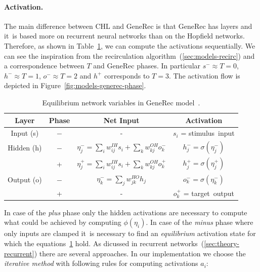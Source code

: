 \paragraph{Activation.} 
\label{sec:models-generec-activation} 
The main difference between CHL and GeneRec is that GeneRec has layers and it~is based more on recurrent neural networks than on the Hopfield networks. Therefore, as shown in Table~\ref{tab:models-generec}, we can compute the activations sequentially. We can see the inspiration from the recirculation algorithm~(\ref{sec:models-recirc}) and a correspondence between $T$ and GeneRec phases. In particular $s^{-} \approx T=0$, $h^{-} \approx T=1$, $o^{-} \approx T=2$ and $h^{+}$ corresponds to $T=3$. The activation flow is depicted in Figure~\ref{fig:models-generec-phase}.
\begin{table}[H]
  \centering
  \begin{tabular}{|cccc|}
    \hline
    Layer & Phase & Net Input & Activation\\
    \hline
    Input (s)    & $-$ & - & $s_i$ = \mbox{stimulus input} \\
    \hline
    Hidden (h)   & $-$ & \hspace{0.3cm}$\eta^{-}_j = \sum_i w_{ij}^{IH}s_i + \sum_k w_{kj}^{OH}o^{-}_k$\hspace{0.3cm} &
    $h^{-}_j = \sigma(\eta^{-}_j)$\hspace{0.3cm}\\
          &  +  & $\eta^{+}_j = \sum_{i}w_{ij}^{IH}s_i + \sum_k w_{kj}^{OH}o^{+}_k$ & $h^{+}_{j} = \sigma(\eta^{+}_j)$ \\
    \hline
    Output (o) & $-$ & $\eta^{-}_k = \sum_j w_{jk}^{HO}h_j$ & $o^{-}_k = \sigma(\eta^{-}_k)$\\
           &  +  & - & $o^{+}_k$ = \mbox{target output} \\ %
    \hline
  \end{tabular}
  \caption{Equilibrium network variables in GeneRec model~\citet{o1996bio}.}
  \label{tab:models-generec}
\end{table}
In case of the \emph{plus} phase only the hidden activations are necessary to compute what could be achieved by computing $\phi(\eta_i)$. In case of the \emph{minus} phase where only inputs are clamped it~is necessary to find an \emph{equilibrium} activation state for which the equations~\ref{tab:models-generec} hold. As dicussed in recurrent networks~(\ref{sec:theory-recurrent}) there are several approaches. In our implementation we choose the \emph{iterative method} with following rules for computing activations $a_i$: 
